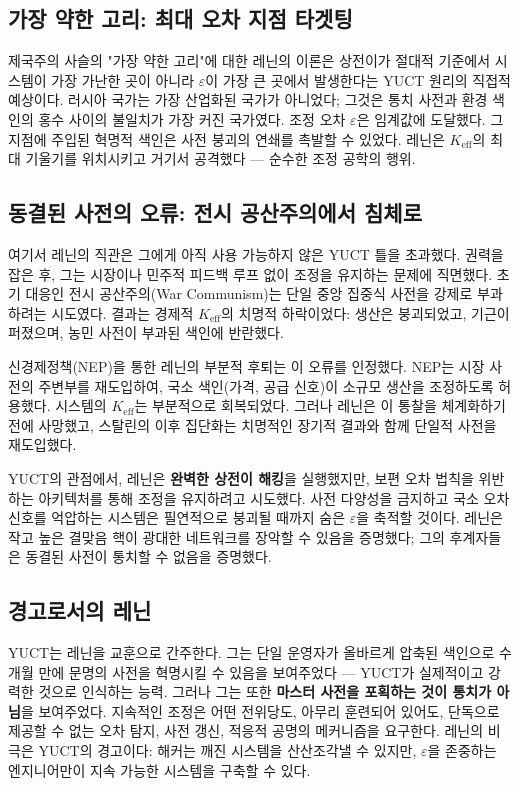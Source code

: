 \documentclass[12pt,a4paper]{article}
\newcommand{\Keff}{K_{\mathrm{eff}}}
\begin{document}
	\subsection{가장 약한 고리: 최대 오차 지점 타겟팅}
	
	제국주의 사슬의 "가장 약한 고리"에 대한 레닌의 이론은 상전이가 절대적 기준에서 시스템이 가장 가난한 곳이 아니라 \(\varepsilon\)이 가장 큰 곳에서 발생한다는 YUCT 원리의 직접적 예상이다. 러시아 국가는 가장 산업화된 국가가 아니었다; 그것은 통치 사전과 환경 색인의 홍수 사이의 불일치가 가장 커진 국가였다. 조정 오차 \(\varepsilon\)은 임계값에 도달했다. 그 지점에 주입된 혁명적 색인은 사전 붕괴의 연쇄를 촉발할 수 있었다. 레닌은 \(\Keff\)의 최대 기울기를 위치시키고 거기서 공격했다 — 순수한 조정 공학의 행위.
	
	\subsection{동결된 사전의 오류: 전시 공산주의에서 침체로}
	
	여기서 레닌의 직관은 그에게 아직 사용 가능하지 않은 YUCT 틀을 초과했다. 권력을 잡은 후, 그는 시장이나 민주적 피드백 루프 없이 조정을 유지하는 문제에 직면했다. 초기 대응인 전시 공산주의(War Communism)는 단일 중앙 집중식 사전을 강제로 부과하려는 시도였다. 결과는 경제적 \(\Keff\)의 치명적 하락이었다: 생산은 붕괴되었고, 기근이 퍼졌으며, 농민 사전이 부과된 색인에 반란했다.
	
	신경제정책(NEP)을 통한 레닌의 부분적 후퇴는 이 오류를 인정했다. NEP는 시장 사전의 주변부를 재도입하여, 국소 색인(가격, 공급 신호)이 소규모 생산을 조정하도록 허용했다. 시스템의 \(\Keff\)는 부분적으로 회복되었다. 그러나 레닌은 이 통찰을 체계화하기 전에 사망했고, 스탈린의 이후 집단화는 치명적인 장기적 결과와 함께 단일적 사전을 재도입했다.
	
	YUCT의 관점에서, 레닌은 \textbf{완벽한 상전이 해킹}을 실행했지만, 보편 오차 법칙을 위반하는 아키텍처를 통해 조정을 유지하려고 시도했다. 사전 다양성을 금지하고 국소 오차 신호를 억압하는 시스템은 필연적으로 붕괴될 때까지 숨은 \(\varepsilon\)을 축적할 것이다. 레닌은 작고 높은 결맞음 핵이 광대한 네트워크를 장악할 수 있음을 증명했다; 그의 후계자들은 동결된 사전이 통치할 수 없음을 증명했다.
	
	\subsection{경고로서의 레닌}
	
	YUCT는 레닌을 교훈으로 간주한다. 그는 단일 운영자가 올바르게 압축된 색인으로 수개월 만에 문명의 사전을 혁명시킬 수 있음을 보여주었다 — YUCT가 실제적이고 강력한 것으로 인식하는 능력. 그러나 그는 또한 \textbf{마스터 사전을 포획하는 것이 통치가 아님}을 보여주었다. 지속적인 조정은 어떤 전위당도, 아무리 훈련되어 있어도, 단독으로 제공할 수 없는 오차 탐지, 사전 갱신, 적응적 공명의 메커니즘을 요구한다. 레닌의 비극은 YUCT의 경고이다: 해커는 깨진 시스템을 산산조각낼 수 있지만, \(\varepsilon\)을 존중하는 엔지니어만이 지속 가능한 시스템을 구축할 수 있다.
	
\end{document}

